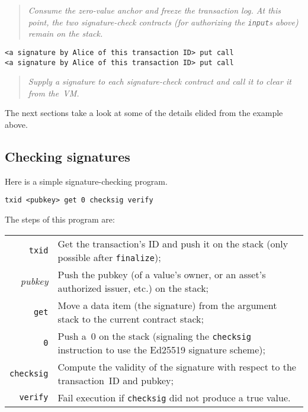 \documentclass{article}
\newenvironment{example}{
  \medskip\begin{adjustwidth}{.25in}{}\footnotesize
}{
  \normalsize\end{adjustwidth}
}
\newenvironment{commentary}{\begin{quote}\itshape}{\normalfont\end{quote}}
\begin{document}
\begin{example}
\begin{commentary}
Consume the zero-value anchor and freeze the transaction log. At this
point, the two signature-check contracts (for authorizing the
{\normalfont\texttt{input}}s above) remain on the stack.
\end{commentary}

\begin{verbatim}
<a signature by Alice of this transaction ID> put call
<a signature by Alice of this transaction ID> put call
\end{verbatim}

\begin{commentary}
Supply a signature to each signature-check contract and call it to
clear it from the~VM.
\end{commentary}

\end{example}

The next sections take a look at some of the details elided from the
example above.

\subsection{Checking signatures}

Here is a simple signature-checking program.

\begin{verbatim}
txid <pubkey> get 0 checksig verify
\end{verbatim}

The steps of this program are:

\medskip

\begin{tabular}{rp{}}
\texttt{txid}     & Get the transaction's ID and push it on the stack (only possible after \texttt{finalize}); \\
\textit{pubkey}   & Push the pubkey (of a value's owner, or an asset's authorized issuer, etc\@.) on the stack; \\
\texttt{get}      & Move a data item (the signature) from the argument stack to the current contract stack; \\
\texttt{0}        & Push a~0 on the stack (signaling the \texttt{checksig} instruction to use the Ed25519 signature scheme); \\
\texttt{checksig} & Compute the validity of the signature with respect to the transaction~ID and pubkey; \\
\texttt{verify}   & Fail execution if \texttt{checksig} did not produce a true value. \\
\end{tabular}
\end{document}
